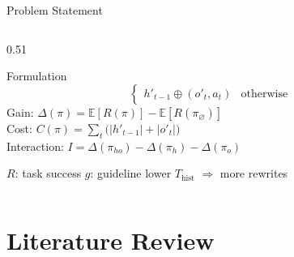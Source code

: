\documentclass[aspectratio=169,10pt]{beamer}
\begin{document}
\begin{frame}{Problem Statement}
\begin{columns}[T]
\begin{column}{0.51\textwidth}
\begin{block}{Formulation}
\[\begin{cases}
h'_{t-1}\oplus(o'_t,a_t) & \text{otherwise}\end{cases}
\]
Gain:\; $\Delta(\pi)=\mathbb{E}[R(\pi)]-\mathbb{E}[R(\pi_\varnothing)]$\\[2pt]
Cost:\; $C(\pi)=\sum_t\big(|h'_{t-1}|+|o'_t|\big)$\\[2pt]
Interaction:\; $I=\Delta(\pi_{ho})-\Delta(\pi_h)-\Delta(\pi_o)$\par\smallskip
\centering $R$: task success \quad $g$: guideline \quad lower $T_{\mathrm{hist}}$
$\Rightarrow$ more rewrites
\end{block}
\end{column}
\end{columns}
\end{frame}

\section{Literature Review}
\end{document}
